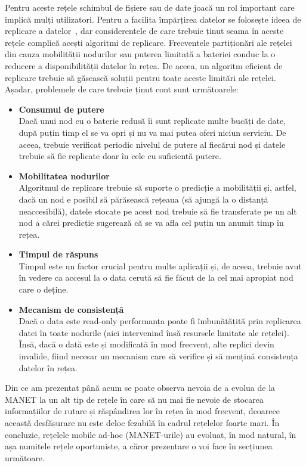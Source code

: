 \documentclass[12pt,a4paper]{report}
\begin{document}
Pentru aceste rețele schimbul de fișiere sau de date joacă un rol important care implică mulți utilizatori. Pentru a facilita împărțirea datelor se folosește ideea de replicare a datelor~\cite{CDRA}, dar considerentele de care trebuie ținut seama în aceste rețele complică acești algoritmi de replicare. Frecventele partiționări ale rețelei din cauza mobilității nodurilor sau puterea limitată a bateriei conduc la o reducere a disponibilității datelor în rețea. De aceea, un algoritm eficient de replicare trebuie să găsească soluții pentru toate aceste limitări ale rețelei. Așadar, problemele de care trebuie ținut cont sunt următoarele:
\begin{itemize}
	\item\textbf{Consumul de putere} \hfill \\
	Dacă unui nod cu o baterie redusă îi sunt replicate multe bucăți de date, după puțin timp el se va opri și nu va mai putea oferi niciun serviciu. De aceea, trebuie verificat periodic nivelul de putere al fiecărui nod și datele trebuie să fie replicate doar în cele cu suficientă putere.
	\item\textbf{Mobilitatea nodurilor} \hfill \\
	Algoritmul de replicare trebuie să suporte o predicție a mobilității și, astfel, dacă un nod e posibil să părăsească rețeaua (să ajungă la o distanță neaccesibilă), datele stocate pe acest nod trebuie să fie transferate pe un alt nod a cărei predicție sugerează că se va afla cel puțin un anumit timp în rețea.
	\item\textbf{Timpul de răspuns} \hfill \\
	Timpul este un factor crucial pentru multe aplicații și, de aceea, trebuie avut în vedere ca accesul la o data cerută să fie făcut de la cel mai apropiat nod care o deține.
	\item\textbf{Mecanism de consistență} \hfill \\
	Dacă o data este read-only performanța poate fi îmbunătățită prin replicarea datei în toate nodurile (aici intervenind însă resursele limitate ale rețelei). Însă, dacă o dată este și modificată în mod frecvent, alte replici devin invalide, fiind necesar un mecanism care să verifice și să mențină consistența datelor în rețea.
\end{itemize}
Din ce am prezentat până acum se poate observa nevoia de a evolua de la MANET la un alt tip de rețele în care să nu mai fie nevoie de stocarea informațiilor de rutare și răspândirea lor în rețea în mod frecvent, deoarece această desfășurare nu este deloc fezabilă în cadrul rețelelor foarte mari. În concluzie, rețelele mobile ad-hoc (MANET-urile) au evoluat, în mod natural, în așa numitele rețele oportuniste, a căror prezentare o voi face în secțiunea următoare.
\fi
\end{document}
